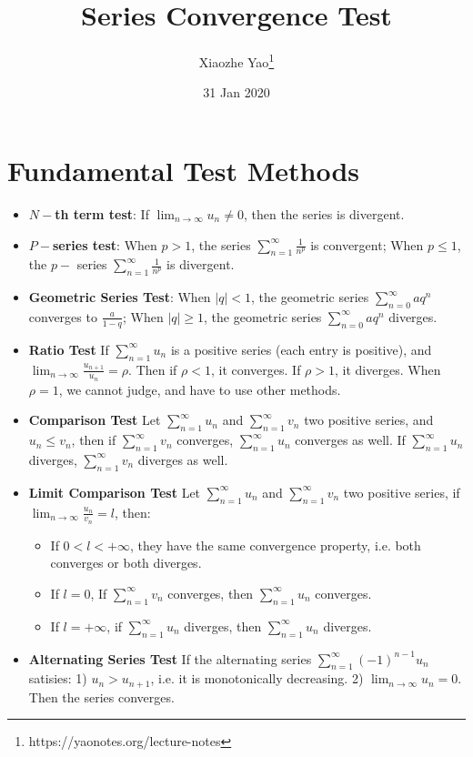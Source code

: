 \documentclass{article}
\title{Series Convergence Test}
\author{Xiaozhe Yao\footnote{https://yaonotes.org/lecture-notes}}
\date{31 Jan 2020}
\theoremstyle{definition}
\begin{document}
\maketitle

\section{Fundamental Test Methods}
\begin{itemize}
    \item \textbf{$N-$th term test}: If $\lim_{n\to\infty}u_n\neq 0$, then the series is divergent.
    \item \textbf{$P-$series test}: When $p>1$, the series $\sum_{n=1}^{\infty}\frac{1}{n^p}$ is convergent; When $p\leq 1$, the $p-$ series $\sum_{n=1}^{\infty}\frac{1}{n^p}$ is divergent.
    \item \textbf{Geometric Series Test}: When $|q|<1$, the geometric series $\sum_{n=0}^{\infty}aq^{n}$ converges to $\frac{a}{1-q}$; When $|q|\geq 1$, the geometric series $\sum_{n=0}^{\infty}aq^{n}$ diverges.
    \item \textbf{Ratio Test} If $\sum_{n=1}^{\infty}u_n$ is a positive series (each entry is positive), and $\lim_{n\to\infty}\frac{u_{n+1}}{u_n}=\rho$. Then if $\rho<1$, it converges. If $\rho>1$, it diverges. When $\rho=1$, we cannot judge, and have to use other methods.
    \item \textbf{Comparison Test} Let $\sum_{n=1}^{\infty}u_n$ and $\sum_{n=1}^{\infty}v_n$ two positive series, and $u_n\leq v_n$, then if $\sum_{n=1}^{\infty}v_n$ converges, $\sum_{n=1}^{\infty}u_n$ converges as well. If $\sum_{n=1}^{\infty}u_n$ diverges, $\sum_{n=1}^{\infty}v_n$ diverges as well.
    \item \textbf{Limit Comparison Test} Let $\sum_{n=1}^{\infty}u_n$ and $\sum_{n=1}^{\infty}v_n$ two positive series, if $\lim_{n\to\infty}\frac{u_n}{v_n}=l$, then:
    \begin{itemize}
        \item If $0<l<+\infty$, they have the same convergence property, i.e. both converges or both diverges.
        \item If $l=0$, If $\sum_{n=1}^{\infty}v_n$ converges, then $\sum_{n=1}^{\infty}u_n$ converges.
        \item If $l=+\infty$, if $\sum_{n=1}^{\infty}u_n$ diverges, then $\sum_{n=1}^{\infty}u_n$ diverges.
    \end{itemize}
    \item \textbf{Alternating Series Test} If the alternating series $\sum_{n=1}^{\infty}(-1)^{n-1}u_n$ satisies: 1) $u_n>u_{n+1}$, i.e. it is monotonically decreasing. 2) $\lim_{n\to\infty}u_n=0$. Then the series converges.
\end{itemize}
\end{document}
